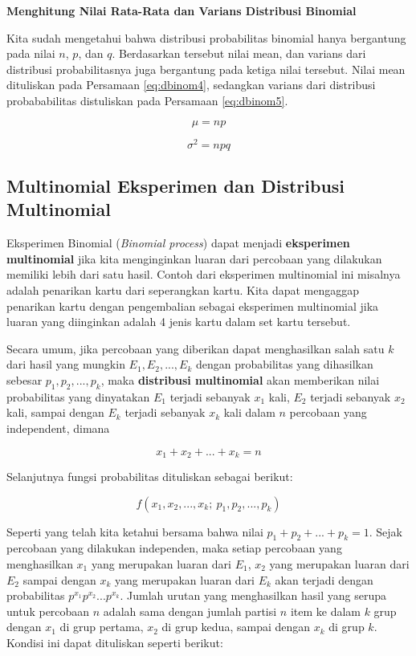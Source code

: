 \documentclass[]{book}
\begin{document}
\textbf{Menghitung Nilai Rata-Rata dan Varians Distribusi Binomial}

Kita sudah mengetahui bahwa distribusi probabilitas binomial hanya
bergantung pada nilai \(n\), \(p\), dan \(q\). Berdasarkan tersebut
nilai mean, dan varians dari distribusi probabilitasnya juga bergantung
pada ketiga nilai tersebut. Nilai mean dituliskan pada Persamaan
\eqref{eq:dbinom4}, sedangkan varians dari distribusi probababilitas
distuliskan pada Persamaan \eqref{eq:dbinom5}.

\begin{equation}
   \mu=np
  \label{eq:dbinom4}
\end{equation}

\begin{equation}
   \sigma^2=npq
  \label{eq:dbinom5}
\end{equation}

\subsection{Multinomial Eksperimen dan Distribusi
Multinomial}\label{multinomial-eksperimen-dan-distribusi-multinomial}

Eksperimen Binomial (\emph{Binomial process}) dapat menjadi
\textbf{eksperimen multinomial} jika kita menginginkan luaran dari
percobaan yang dilakukan memiliki lebih dari satu hasil. Contoh dari
eksperimen multinomial ini misalnya adalah penarikan kartu dari
seperangkan kartu. Kita dapat mengaggap penarikan kartu dengan
pengembalian sebagai eksperimen multinomial jika luaran yang diinginkan
adalah 4 jenis kartu dalam set kartu tersebut.

Secara umum, jika percobaan yang diberikan dapat menghasilkan salah satu
\(k\) dari hasil yang mungkin \(E_1,E_2,...,E_k\) dengan probabilitas
yang dihasilkan sebesar \(p_1,p_2,...,p_k\), maka \textbf{distribusi
multinomial} akan memberikan nilai probabilitas yang dinyatakan \(E_1\)
terjadi sebanyak \(x_1\) kali, \(E_2\) terjadi sebanyak \(x_2\) kali,
sampai dengan \(E_k\) terjadi sebanyak \(x_k\) kali dalam \(n\)
percobaan yang independent, dimana

\[
x_1+x_2+...+x_k=n
\]

Selanjutnya fungsi probabilitas dituliskan sebagai berikut:

\[
f\left(x_1,x_2,...,x_k;\ p_1,p_2,...,p_k\right)
\]

Seperti yang telah kita ketahui bersama bahwa nilai
\(p_1+p_2+...+p_k=1\). Sejak percobaan yang dilakukan independen, maka
setiap percobaan yang menghasilkan \(x_1\) yang merupakan luaran dari
\(E_1\), \(x_2\) yang merupakan luaran dari \(E_2\) sampai dengan
\(x_k\) yang merupakan luaran dari \(E_k\) akan terjadi dengan
probabilitas \(p^{x_1}p^{x_2}...p^{x_k}\). Jumlah urutan yang
menghasilkan hasil yang serupa untuk percobaan \(n\) adalah sama dengan
jumlah partisi \(n\) item ke dalam \(k\) grup dengan \(x_1\) di grup
pertama, \(x_2\) di grup kedua, sampai dengan \(x_k\) di grup \(k\).
Kondisi ini dapat dituliskan seperti berikut:
\end{document}
